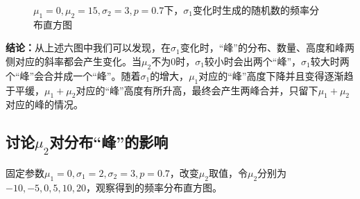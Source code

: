 \documentclass[CJK]{ctexart}
\begin{document}
\begin{figure}[H]
{    }
    \quad
    \quad
    \caption{$\mu_1=0,\mu_2=15,\sigma_2=3,p=0.7$下，$\sigma_1$变化时生成的随机数的频率分布直方图}
    \label{fig2}
\end{figure}

\textbf{结论：}从上述六图中我们可以发现，在$\sigma_1$变化时，“峰”的分布、数量、高度和峰两侧对应的斜率都会产生变化。当$\mu_2$不为0时，$\sigma_1$较小时会出两个“峰”，$\sigma_1$较大时两个“峰”会合并成一个“峰”。随着$\sigma_1$的增大，$\mu_1$对应的“峰”高度下降并且变得逐渐趋于平缓，$\mu_1+\mu_2$对应的“峰”高度有所升高，最终会产生两峰合并，只留下$\mu_1+\mu_2$对应的峰的情况。

\subsection{讨论$\mu_2$对分布“峰”的影响}

固定参数$\mu_1=0,\sigma_1=2,\sigma_2=3,p=0.7$，改变$\mu_2$取值，令$\mu_2$分别为$-10,-5,0,5,10,20$，观察得到的频率分布直方图。
\end{document}
